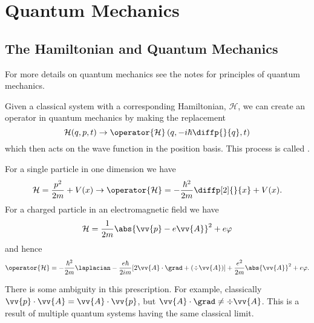 \documentclass[fleqn]{NotesClass}
\newcommand*{\hamiltonian}{\mathcal{H}}
\begin{document}
    \section{Quantum Mechanics}
    \subsection{The Hamiltonian and Quantum Mechanics}
    \begin{rmk}
        For more details on quantum mechanics see the notes for principles of quantum mechanics.
    \end{rmk}
    Given a classical system with a corresponding Hamiltonian, \(\hamiltonian\), we can create an operator in quantum mechanics by making the replacement
    \begin{equation}
        \hamiltonian(q, p, t) \to \operator{\hamiltonian}\left( q, -i\hbar \diffp{}{q}, t \right)
    \end{equation}
    which then acts on the wave function in the position basis.
    This process is called .
    
    \begin{exm}{}{}
        For a single particle in one dimension we have
        \begin{equation}
            \hamiltonian = \frac{p^2}{2m} + V(x) \to \operator{\hamiltonian} = -\frac{\hbar^2}{2m}\diffp[2]{}{x} + V(x).
        \end{equation}
        For a charged particle in an electromagnetic field we have
        \begin{equation}
            \hamiltonian = \frac{1}{2m} \abs{\vv{p} - e\vv{A}}^2 + e\varphi
        \end{equation}
        and hence
        \begin{equation}
            \operator{\hamiltonian} = -\frac{\hbar^2}{2m}\laplacian - \frac{e\hbar}{2im}[2\vv{A} \cdot \grad + (\div \vv{A})] + \frac{e^2}{2m} \abs{\vv{A}}^2 + e\varphi.
        \end{equation}
        \begin{rmk}
            There is some ambiguity in this prescription.
            For example, classically \(\vv{p} \cdot \vv{A} = \vv{A} \cdot \vv{p}\), but \(\vv{A} \cdot \grad \ne \div\vv{A}\).
            This is a result of multiple quantum systems having the same classical limit.
        \end{rmk}
    \end{exm}
    
\end{document}
